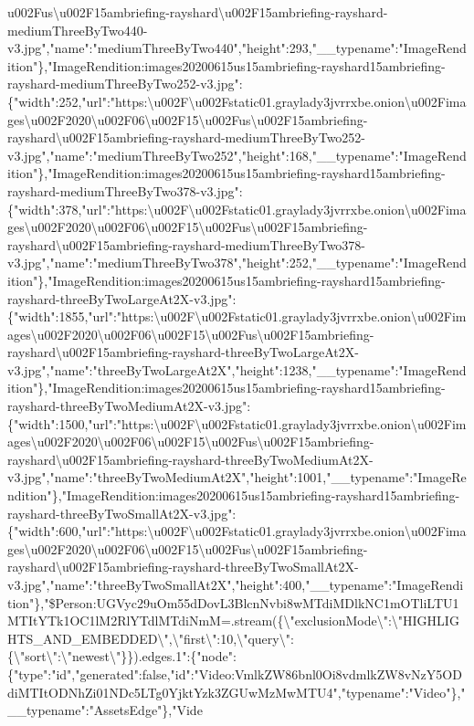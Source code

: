 {}u002Fus\textbackslash{}u002F15ambriefing-rayshard\textbackslash{}u002F15ambriefing-rayshard-mediumThreeByTwo440-v3.jpg","name":"mediumThreeByTwo440","height":293,"\_\_typename":"ImageRendition"\},"ImageRendition:images20200615us15ambriefing-rayshard15ambriefing-rayshard-mediumThreeByTwo252-v3.jpg":\{"width":252,"url":"https:\textbackslash{}u002F\textbackslash{}u002Fstatic01.graylady3jvrrxbe.onion\textbackslash{}u002Fimages\textbackslash{}u002F2020\textbackslash{}u002F06\textbackslash{}u002F15\textbackslash{}u002Fus\textbackslash{}u002F15ambriefing-rayshard\textbackslash{}u002F15ambriefing-rayshard-mediumThreeByTwo252-v3.jpg","name":"mediumThreeByTwo252","height":168,"\_\_typename":"ImageRendition"\},"ImageRendition:images20200615us15ambriefing-rayshard15ambriefing-rayshard-mediumThreeByTwo378-v3.jpg":\{"width":378,"url":"https:\textbackslash{}u002F\textbackslash{}u002Fstatic01.graylady3jvrrxbe.onion\textbackslash{}u002Fimages\textbackslash{}u002F2020\textbackslash{}u002F06\textbackslash{}u002F15\textbackslash{}u002Fus\textbackslash{}u002F15ambriefing-rayshard\textbackslash{}u002F15ambriefing-rayshard-mediumThreeByTwo378-v3.jpg","name":"mediumThreeByTwo378","height":252,"\_\_typename":"ImageRendition"\},"ImageRendition:images20200615us15ambriefing-rayshard15ambriefing-rayshard-threeByTwoLargeAt2X-v3.jpg":\{"width":1855,"url":"https:\textbackslash{}u002F\textbackslash{}u002Fstatic01.graylady3jvrrxbe.onion\textbackslash{}u002Fimages\textbackslash{}u002F2020\textbackslash{}u002F06\textbackslash{}u002F15\textbackslash{}u002Fus\textbackslash{}u002F15ambriefing-rayshard\textbackslash{}u002F15ambriefing-rayshard-threeByTwoLargeAt2X-v3.jpg","name":"threeByTwoLargeAt2X","height":1238,"\_\_typename":"ImageRendition"\},"ImageRendition:images20200615us15ambriefing-rayshard15ambriefing-rayshard-threeByTwoMediumAt2X-v3.jpg":\{"width":1500,"url":"https:\textbackslash{}u002F\textbackslash{}u002Fstatic01.graylady3jvrrxbe.onion\textbackslash{}u002Fimages\textbackslash{}u002F2020\textbackslash{}u002F06\textbackslash{}u002F15\textbackslash{}u002Fus\textbackslash{}u002F15ambriefing-rayshard\textbackslash{}u002F15ambriefing-rayshard-threeByTwoMediumAt2X-v3.jpg","name":"threeByTwoMediumAt2X","height":1001,"\_\_typename":"ImageRendition"\},"ImageRendition:images20200615us15ambriefing-rayshard15ambriefing-rayshard-threeByTwoSmallAt2X-v3.jpg":\{"width":600,"url":"https:\textbackslash{}u002F\textbackslash{}u002Fstatic01.graylady3jvrrxbe.onion\textbackslash{}u002Fimages\textbackslash{}u002F2020\textbackslash{}u002F06\textbackslash{}u002F15\textbackslash{}u002Fus\textbackslash{}u002F15ambriefing-rayshard\textbackslash{}u002F15ambriefing-rayshard-threeByTwoSmallAt2X-v3.jpg","name":"threeByTwoSmallAt2X","height":400,"\_\_typename":"ImageRendition"\},"\$Person:UGVyc29uOm55dDovL3BlcnNvbi8wMTdiMDlkNC1mOTliLTU1MTItYTk1OC1lM2RlYTdlMTdiNmM=.stream(\{\textbackslash{}"exclusionMode\textbackslash{}":\textbackslash{}"HIGHLIGHTS\_AND\_EMBEDDED\textbackslash{}",\textbackslash{}"first\textbackslash{}":10,\textbackslash{}"query\textbackslash{}":\{\textbackslash{}"sort\textbackslash{}":\textbackslash{}"newest\textbackslash{}"\}\}).edges.1":\{"node":\{"type":"id","generated":false,"id":"Video:VmlkZW86bnl0Oi8vdmlkZW8vNzY5ODdiMTItODNhZi01NDc5LTg0YjktYzk3ZGUwMzMwMTU4","typename":"Video"\},"\_\_typename":"AssetsEdge"\},"Vide